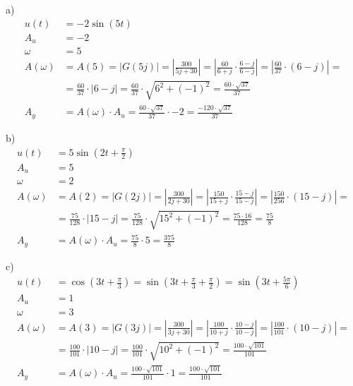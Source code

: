 a)
\begin{align*}
u(t) &= -2\sin{(5t)} \\
A_u &= -2 \\
\omega &= 5 \\
A(\omega) &= A(5) = |G(5j)| = \left| \frac{300}{5j+30} \right| 
= \left| \frac{60}{6+j} \cdot \frac{6-j}{6-j} \right|
= \left| \frac{60}{37} \cdot (6-j) \right| = \\
&= \frac{60}{37} \cdot |6-j| = \frac{60}{37} \cdot \sqrt{6^2+(-1)^2} 
= \frac{60 \cdot \sqrt{37}}{37} \\
A_y &= A(\omega) \cdot A_u = \frac{60 \cdot \sqrt{37}}{37} \cdot -2
= \boxed{ \frac{-120 \cdot \sqrt{37}}{37} }
\end{align*}

b)
\begin{align*}
u(t) &= 5\sin{\left( 2t+\frac{\pi}{2} \right)} \\
A_u &= 5 \\
\omega &= 2 \\
A(\omega) &= A(2) = |G(2j)| = \left| \frac{300}{2j+30} \right| 
= \left| \frac{150}{15+j} \cdot \frac{15-j}{15-j} \right|
= \left| \frac{150}{256} \cdot (15-j) \right| = \\
&= \frac{75}{128} \cdot |15-j| = \frac{75}{128} \cdot \sqrt{15^2+(-1)^2} 
= \frac{75 \cdot 16}{128} = \frac{75}{8} \\
A_y &= A(\omega) \cdot A_u = \frac{75}{8} \cdot 5
= \boxed{ \frac{375}{8} }
\end{align*}

c)
\begin{align*}
u(t) &= \cos{\left( 3t+\frac{\pi}{3} \right)} = \sin{\left( 3t+\frac{\pi}{3}+\frac{\pi}{2} \right)}
= \sin{\left( 3t+\frac{5\pi}{6} \right)} \\
A_u &= 1 \\
\omega &= 3 \\
A(\omega) &= A(3) = |G(3j)| = \left| \frac{300}{3j+30} \right| 
= \left| \frac{100}{10+j} \cdot \frac{10-j}{10-j} \right|
= \left| \frac{100}{101} \cdot (10-j) \right| = \\
&= \frac{100}{101} \cdot |10-j| = \frac{100}{101} \cdot \sqrt{10^2+(-1)^2} 
= \frac{100 \cdot \sqrt{101}}{101} \\
A_y &= A(\omega) \cdot A_u = \frac{100 \cdot \sqrt{101}}{101} \cdot 1
= \boxed{ \frac{100 \cdot \sqrt{101}}{101} }
\end{align*}


\pagebreak
